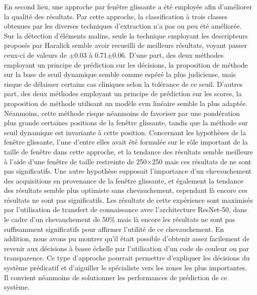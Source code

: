 En second lieu, une approche par fenêtre glissante a été employée afin d'améliorer la qualité des résultats. Par cette approche, la classification à trois classes obtenues par les diverses techniques d'extraction n'a pas ou peu été améliorée. Sur la détection d'éléments malins, seule la technique employant les descripteurs proposés par Haralick semble avoir recueilli de meilleurs résultats, voyant passer ceux-ci de valeurs de $\pm$0.03 à 0.71$\pm$0.06. D'une part, des deux méthodes employant un principe de prédiction sur les décisions, la proposition de méthode sur la base de seuil dynamique semble comme espéré la plus judicieuse, mais risque de délaisser certains cas cliniques selon la tolérance de ce seuil. D'autres part, des deux méthodes employant un principe de prédiction sur les scores, la proposition de méthode utilisant un modèle \gls{svm} linéaire semble la plus adaptée. Néanmoins, cette méthode risque néanmoins de favoriser par une pondération plus grande certaines positions de la fenêtre glissante, tandis que la méthode sur seuil dynamique est invariante à cette position. Concernant les hypothèses de la fenêtre glissante, l'une d'entre elles avait été formulée sur le rôle important de la taille de fenêtre dans cette approche, et la tendance des résultats semble meilleure à l'aide d’une fenêtre de taille restreinte de 250$\times$250 mais ces résultats de ne sont pas significatifs. Une autre hypothèse supposait l'importance d'un chevauchement des acquisitions en provenance de la fenêtre glissante, et également la tendance des résultats semble plus optimiste sans chevauchement, cependant là encore ces résultats ne sont pas significatifs. Les résultats de cette expérience sont maximisés par l'utilisation de transfert de connaissance avec l'architecture ResNet-50, dans le cadre d'un chevauchement de 50\% mais là encore les résultats ne sont pas suffisamment significatifs pour affirmer l'utilité de ce chevauchement. En addition, nous avons pu montrer qu'il était possible d'obtenir assez facilement de revenir aux décisions à basse échelle par l'utilisation d'un code de couleur ou par transparence. Ce type d'approche pourrait permettre d'expliquer les décisions du système prédicatif et d'aiguiller le spécialiste vers les zones les plus importantes. Il convient néanmoins de solutionner les performances de prédiction de ce système.\par 

